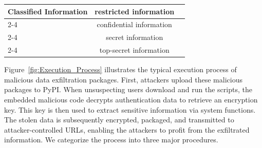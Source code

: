 \begin{table}[!t]
\begin{tabular}{|m{3.3cm}|m{2.3cm}|m{2.5cm}|m{2.0cm}|}
    \multirow{4}{*}{Classified Information} & \multicolumn{2}{c|}{restricted information} & \cite{techtarget}\\ \cline{2-4} 
                                          & \multicolumn{2}{c|}{confidential information} & \cite{techtarget}\\ \cline{2-4} 
                                          & \multicolumn{2}{c|}{secret information} & \cite{techtarget}\\ \cline{2-4} 
                                          & \multicolumn{2}{c|}{top-secret information} & \cite{techtarget}\\ \hline
    \end{tabular}
\end{table}

Figure~\ref{fig:Execution_Process} illustrates the typical execution process of malicious data exfiltration packages. First, attackers upload these malicious packages to PyPI. When unsuspecting users download and run the scripts, the embedded malicious code decrypts authentication data to retrieve an encryption key. This key is then used to extract sensitive information via system functions. The stolen data is subsequently encrypted, packaged, and transmitted to attacker-controlled URLs, enabling the attackers to profit from the exfiltrated information. We categorize the process into three major procedures. 


